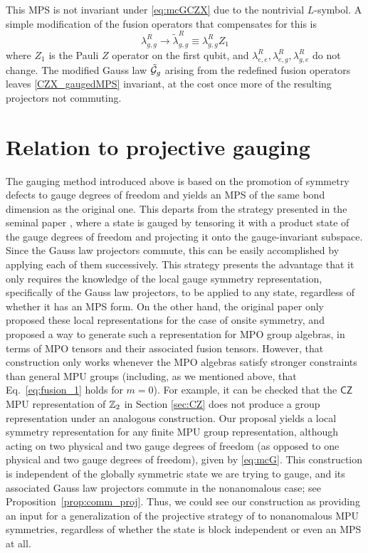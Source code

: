 \documentclass[reprint,
superscriptaddress,
amsmath,amssymb,
notitlepage,
aps,
prb,
10pt, 
tightenlines
]{revtex4-2}
\begin{document}
This MPS is not invariant under \eqref{eq:mcGCZX} due to the nontrivial $L$-symbol. A simple modification of the fusion operators that compensates for this is
\begin{equation}
    \lambda^R_{g,g}\to\tilde\lambda^R_{g,g}\equiv \lambda^R_{g,g}Z_1
\end{equation}
where $Z_1$ is the Pauli $Z$ operator on the first qubit, and $\lambda^R_{e,e}, \lambda^R_{e,g}, \lambda^R_{g,e}$ do not change. The modified Gauss law $\tilde {\mathcal{G}}_g$ arising from the redefined fusion operators leaves \eqref{CZX_gaugedMPS} invariant, at the cost once more of the resulting projectors not commuting.

\section{Relation to projective gauging}
\label{sec:projHam}
The gauging method introduced above is based on the promotion of symmetry defects to gauge degrees of freedom and yields an MPS of the same bond dimension as the original one. This departs from the strategy presented in the seminal paper \cite{PhysRevX.5.011024}, where a state is gauged by tensoring it with a product state of the gauge degrees of freedom and projecting it onto the gauge-invariant subspace. Since the Gauss law projectors commute, this can be easily accomplished by applying each of them successively. This strategy presents the advantage that it only requires the knowledge of the local gauge symmetry representation, specifically of the Gauss law projectors, to be applied to any state, regardless of whether it has an MPS form. On the other hand, the original paper only proposed these local representations for the case of onsite symmetry, and \cite{GarreKull} proposed a way to generate such a representation for MPO group algebras, in terms of MPO tensors and their associated fusion tensors. However, that construction only works whenever the MPO algebras satisfy stronger constraints than general MPU groups (including, as we mentioned above, that Eq.~\eqref{eq:fusion_1} holds for $m=0$). For example, it can be checked that the $\mathsf{CZ}$ MPU representation of $\mathbb{Z}_2$ in Section \ref{sec:CZ} does not produce a group representation under an analogous construction. Our proposal yields a local symmetry representation for any finite MPU group representation, although acting on two physical and two gauge degrees of freedom (as opposed to one physical and two gauge degrees of freedom), given by \eqref{eq:mcG}. This construction is independent of the globally symmetric state we are trying to gauge, and its associated Gauss law projectors commute in the nonanomalous case; see Proposition~\ref{prop:comm_proj}. Thus, we could see our construction as providing an input for a generalization of the projective strategy of \cite{PhysRevX.5.011024} to nonanomalous MPU symmetries, regardless of whether the state is block independent or even an MPS at all.
\end{document}
